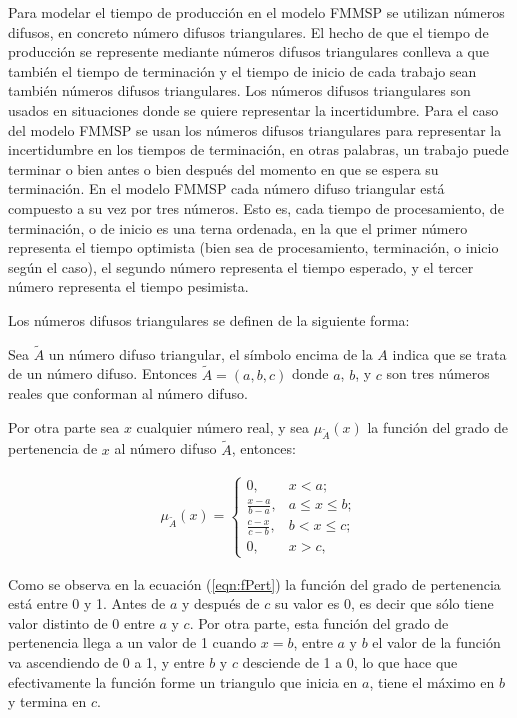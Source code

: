 \documentclass{article}
\begin{document}
\vspace{\baselineskip}
Para modelar el tiempo de producción en el modelo FMMSP se utilizan números difusos, en concreto número difusos triangulares. El hecho de que el tiempo de producción se represente mediante números difusos triangulares conlleva a que también el tiempo de terminación y el tiempo de inicio de cada trabajo sean también números difusos triangulares. Los números difusos triangulares son usados en situaciones donde se quiere representar la incertidumbre. Para el caso del modelo FMMSP se usan los números difusos triangulares para representar la incertidumbre en los tiempos de terminación, en otras palabras, un trabajo puede terminar o bien antes o bien después del momento en que se espera su terminación. En el modelo FMMSP cada número difuso triangular está compuesto a su vez por tres números. Esto es, cada tiempo de procesamiento, de terminación, o de inicio es una terna ordenada, en la que el primer número representa el tiempo optimista (bien sea de procesamiento, terminación, o inicio según el caso), el segundo número representa el tiempo esperado, y el tercer número representa el tiempo pesimista. \autocite{modFMMSP}

\vspace{\baselineskip}
Los números difusos triangulares se definen de la siguiente forma: \autocite{fuzzyNum}

\vspace{\baselineskip}
Sea $\tilde{A}$ un número difuso triangular, el símbolo encima de la $A$ indica que se trata de un número difuso. Entonces $\tilde{A} = (a,b,c)$ donde $a$, $b$, y $c$ son tres números reales que conforman al número difuso.

Por otra parte sea $x$ cualquier número real, y sea $\mu_{\tilde{A}}(x)$ la función del grado de pertenencia de $x$ al número difuso $\tilde{A}$, entonces:

\begin{align}
    \label{eqn:fPert}
    \mu_{\tilde{A}}(x) =
    \begin{cases}
        0,   & x < a;\\
        \frac{x-a}{b-a},   & a \leq x \leq b;\\
        \frac{c-x}{c-b},   & b < x \leq c;\\
        0,   & x > c,
    \end{cases}
\end{align}

Como se observa en la ecuación (\ref{eqn:fPert}) la función del grado de pertenencia está entre 0 y 1. Antes de $a$ y después de $c$ su valor es 0, es decir que sólo tiene valor distinto de 0 entre $a$ y $c$. Por otra parte, esta función del grado de pertenencia llega a un valor de 1 cuando $x = b$, entre $a$ y $b$ el valor de la función va ascendiendo de 0 a 1, y entre $b$ y $c$ desciende de 1 a 0, lo que hace que efectivamente la función forme un triangulo que inicia en $a$, tiene el máximo en $b$ y termina en $c$. \autocite{fuzzyNum}
\end{document}

